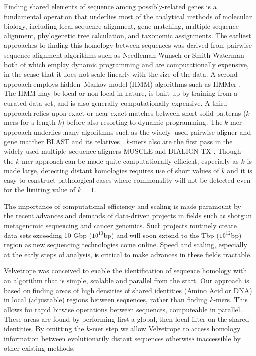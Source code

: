 \documentclass[phd,tocprelim]{cornell}
\begin{document}
Finding shared elements of sequence among possibly-related genes is a
fundamental operation that underlies most of the analytical methods of
molecular biology, including local sequence alignment, gene matching,
multiple sequence alignment, phylogenetic tree calculation, and
taxonomic assignments. The earliest approaches to finding this homology
between sequences was derived from pairwise sequence alignment algorithms
such as Needleman-Wunsch \cite{Needleman70} or Smith-Waterman
\cite{SmithWaterman} both of which employ dynamic programming and
are computationally expensive, in the sense that it does not scale linearly with the size of the data. A second approach employs
hidden--Markov model (HMM) algorithms such as HMMer
\cite{Eddy98}. The HMM may be local or non-local in nature, is
built up by training from a curated data set, and is also generally
computationally expensive. A third approach relies upon exact or
near-exact matches between short solid patterns ($k$-mers for a length $k$) before also resorting to dynamic programming.  The
$k$-mer approach underlies many algorithms such as the widely--used
pairwise aligner and gene matcher BLAST \cite{BLAST} and its
relatives \cite{BLAT,Megablast,PSIBLAST}. $k$-mers also are the first pass in the widely used multiple--sequence aligners
MUSCLE \cite{MUSCLE} and DIALIGN-TX \cite{DIALIGN-TX}. Though the $k$-mer approach can be made quite computationally
efficient, especially as $k$ is made large, detecting distant
homologies requires use of short values of $k$ and it is easy to
construct pathological cases where commonality will not be detected
even for the limiting value of $k = 1$.

The importance of computational efficiency and scaling is made paramount by the recent advances
and demands of data-driven projects in fields such as
shotgun metagenomic sequencing and cancer genomics. Such projects
routinely create data sets exceeding 10 Gbp ($10^{10}$bp) and will soon extend
to the Tbp ($10^{12}$bp) region as new sequencing technologies come online. Speed
and scaling, especially at the early steps of analysis, is critical to make advances in these fields tractable.

Velvetrope was conceived to enable the identification of sequence homology with an algorithm that
is simple, scalable and parallel from the start. Our approach is based on finding areas of high densities of shared identities (Amino Acid or DNA) in local
(adjustable) regions between sequences, rather than finding $k$-mers. This allows for rapid bitwise operations between sequences, computeable in parallel. These areas are found by performing first a global, then local filter on the shared identities. By omitting the $k$-mer step we allow Velvetrope to access homology information between evolutionarily distant sequences otherwise inaccessible by other existing methods.
\end{document}
